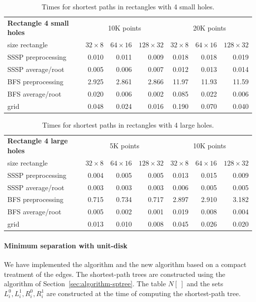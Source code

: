 \documentclass[a4paper,11pt]{article}
\begin{document}
\begin{table}[ht]
\begin{tabular}{l*{3}{r}|*{3}{r}}
\textbf{Rectangle 4 small holes\hspace{-.2cm}} & \multicolumn{3}{c|}{10K points} & \multicolumn{3}{c}{20K points}\\
size rectangle	&	$32\times 8$	&	$64\times 16$	&	$128\times 32$	&	$32\times 8$	&	$64\times 16$	&	$128\times 32$\\						
\hline
SSSP preprocessing	&	0.010	&	0.011	&	0.009	&	0.018	&	0.018	&	0.019	\\
SSSP average/root	&	0.005	&	0.006	&	0.007	&	0.012	&	0.013	&	0.014	\\
BFS preprocessing	&	2.925	&	2.861	&	2.866	&	11.97	&	11.93	&	11.59	\\
BFS average/root	&	0.020	&	0.006	&	0.002	&	0.085	&	0.022	&	0.006	\\
grid				&	0.048	&	0.024	&	0.016	&	0.190	&	0.070	&	0.040
\end{tabular}
\caption{Times for shortest paths in rectangles with 4 small holes.}
\label{table4}
\end{table}



\begin{table}[ht]
\begin{tabular}{l*{3}{r}|*{3}{r}}
\textbf{Rectangle 4 large holes} & \multicolumn{3}{c|}{5K points} & \multicolumn{3}{c}{10K points}\\
size rectangle	&	$32\times 8$	&	$64\times 16$	&	$128\times 32$	&	$32\times 8$	&	$64\times 16$	&	$128\times 32$\\						
\hline
SSSP preprocessing	&	0.004	&	0.005	&	0.005	&	0.013	&	0.015	&	0.009	\\
SSSP average/root	&	0.003	&	0.003	&	0.003	&	0.006	&	0.005	&	0.005	\\
BFS preprocessing	&	0.715	&	0.734	&	0.717	&	2.897	&	2.910	&	3.182	\\
BFS average/root	&	0.005	&	0.002	&	0.001	&	0.019	&	0.008	&	0.004	\\
grid				&	0.013	&	0.010	&	0.008	&	0.045	&	0.026	&	0.020
\end{tabular}
\caption{Times for shortest paths in rectangles with 4 large holes.}
\label{table5}
\end{table}



\paragraph{Minimum separation with unit-disk}
We have implemented the algorithm 
and the new algorithm based on a compact treatment of the edges.
The shortest-path trees are constructed using the algorithm of Section~\ref{sec:algorithm-sptree}.
The table $N[~]$ and the sets $L^0_i,L^1_i,R^0_i,R^1_i$
are constructed at the time of computing the shortest-path tree.
\end{document}
